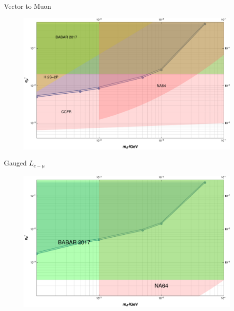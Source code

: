\documentclass[11pt]{beamer}
\numberwithin{equation}{section}
\begin{document}
\begin{frame}{Vector to Muon}
\begin{figure}[!ht]
  \centering
    \includegraphics[width=\textwidth]{../imgs/MuBoundOnVectorMuon}
\end{figure}
\end{frame}

\begin{frame}{Gauged $L_{e-\mu}$}
\begin{figure}[!ht]
  \centering
    \includegraphics[width=\textwidth]{../imgs/MuBoundOnVectorLepton}
\end{figure}
\end{frame}
\end{document}
